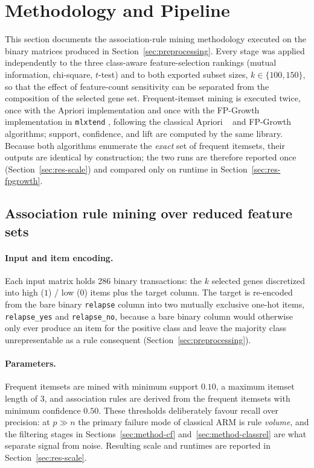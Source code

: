 \documentclass[twocolumn]{article}
\begin{document}
\section{Methodology and Pipeline}

This section documents the association-rule mining methodology executed on the
binary matrices produced in Section~\ref{sec:preprocessing}. Every stage was
applied independently to the three class-aware feature-selection rankings
(mutual information, chi-square, $t$-test) and to both exported subset sizes,
$k \in \{100, 150\}$, so that the effect of feature-count sensitivity can be
separated from the composition of the selected gene set. Frequent-itemset
mining is executed twice, once with the Apriori implementation and once with
the FP-Growth implementation in \texttt{mlxtend}
\citep{raschka2018mlxtend}, following the classical Apriori
\citep{agrawal1994fast}~\citep{agrawal1993mining} and FP-Growth
\citep{han2000mining} algorithms; support, confidence, and lift are computed
by the same library. Because both algorithms enumerate the \emph{exact} set of
frequent itemsets, their outputs are identical by construction; the two runs
are therefore reported once (Section~\ref{sec:res-scale}) and compared only on
runtime in Section~\ref{sec:res-fpgrowth}.

\subsection{Association rule mining over reduced feature sets}

\paragraph{Input and item encoding.} Each input matrix holds 286 binary
transactions: the $k$ selected genes discretized into high ($1$) / low ($0$)
items plus the target column. The target is re-encoded from the bare binary
\texttt{relapse} column into two mutually exclusive one-hot items,
\texttt{relapse\_yes} and \texttt{relapse\_no}, because a bare binary column
would otherwise only ever produce an item for the positive class and leave the
majority class unrepresentable as a rule consequent (Section~\ref{sec:preprocessing}).

\paragraph{Parameters.} Frequent itemsets are mined with minimum support
$0.10$, a maximum itemset length of 3, and association rules are derived from
the frequent itemsets with minimum confidence $0.50$. These thresholds
deliberately favour recall over precision: at $p \gg n$ the primary failure
mode of classical ARM is rule \emph{volume}, and the filtering stages in
Sections~\ref{sec:method-cf} and~\ref{sec:method-classrel} are what separate
signal from noise. Resulting scale and runtimes are reported in
Section~\ref{sec:res-scale}.
\end{document}
